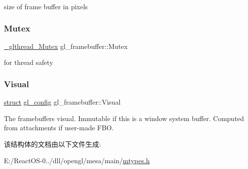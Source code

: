 size of frame buffer in pixels \mbox{\label{structgl__framebuffer_aa6235e67026519c69cc955c2e90b87ce}} 
\subsubsection{\texorpdfstring{Mutex}{Mutex}}
{\footnotesize\ttfamily \hyperlink{struct___c_r_i_t_i_c_a_l___s_e_c_t_i_o_n}{\+\_\+glthread\+\_\+\+Mutex} gl\+\_\+framebuffer\+::\+Mutex}

for thread safety \mbox{\label{structgl__framebuffer_aa3ba32377612702a75b54ce1824ff9e0}} 
\subsubsection{\texorpdfstring{Visual}{Visual}}
{\footnotesize\ttfamily \hyperlink{interfacestruct}{struct} \hyperlink{structgl__config}{gl\+\_\+config} gl\+\_\+framebuffer\+::\+Visual}

The framebuffer\textquotesingle{}s visual. Immutable if this is a window system buffer. Computed from attachments if user-\/made F\+BO. 

该结构体的文档由以下文件生成\+:\begin{DoxyCompactItemize}
\item 
E\+:/\+React\+O\+S-\/0../dll/opengl/mesa/main/\hyperlink{mtypes_8h}{mtypes.\+h}\end{DoxyCompactItemize}
